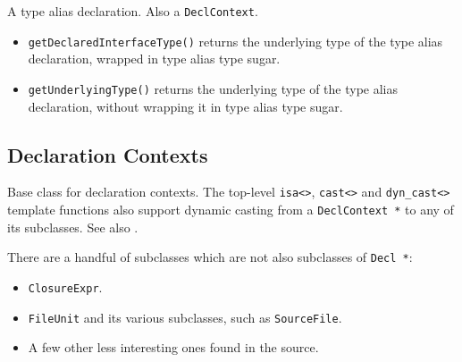\documentclass[../generics]{subfiles}
\begin{document}
A type alias declaration. Also a \texttt{DeclContext}.
\begin{itemize}
\item \texttt{getDeclaredInterfaceType()} returns the underlying type of the type alias declaration, wrapped in type alias type sugar.
\item \texttt{getUnderlyingType()} returns the underlying type of the type alias declaration, without wrapping it in type alias type sugar.
\end{itemize}

\subsection*{Declaration Contexts}

Base class for declaration contexts. The top-level \verb|isa<>|, \verb|cast<>| and \verb|dyn_cast<>| template functions also support dynamic casting from a \texttt{DeclContext *} to any of its subclasses. See also .

There are a handful of subclasses which are not also subclasses of \texttt{Decl *}:
\begin{itemize}
\item \texttt{ClosureExpr}.
\item \texttt{FileUnit} and its various subclasses, such as \texttt{SourceFile}.
\item A few other less interesting ones found in the source.
\end{itemize}
\end{document}
